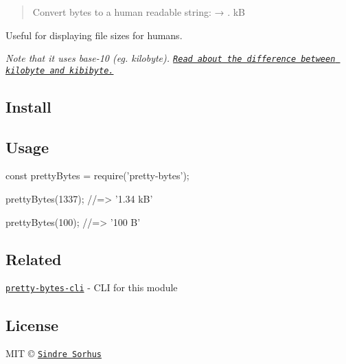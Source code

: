 \begin{quote}
Convert bytes to a human readable string\+: {} → {. kB} \end{quote}


Useful for displaying file sizes for humans.


\begin{DoxyItemize}
\item {\itshape Note that it uses base-\/10 (eg. kilobyte). \href{http://pacoup.com/2009/05/26/kb-kb-kib-whats-up-with-that/}{\tt Read about the difference between kilobyte and kibibyte.}}
\end{DoxyItemize}

\subsection*{Install}




\subsection*{Usage}


\begin{DoxyCode}
const prettyBytes = require('pretty-bytes');

prettyBytes(1337);
//=> '1.34 kB'

prettyBytes(100);
//=> '100 B'
\end{DoxyCode}


\subsection*{Related}


\begin{DoxyItemize}
\item \href{https://github.com/sindresorhus/pretty-bytes-cli}{\tt pretty-\/bytes-\/cli} -\/ C\+LI for this module
\end{DoxyItemize}

\subsection*{License}

M\+IT © \href{http://sindresorhus.com}{\tt Sindre Sorhus} 